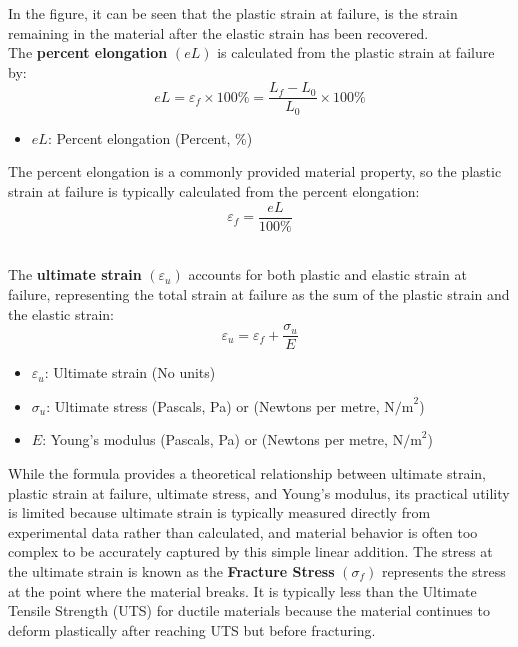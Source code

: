 \documentclass{article}
\begin{document}
\begin{minipage}{0.51\textwidth}
In the figure, it can be seen that the plastic strain at failure, is the strain remaining in the material after the elastic strain has been recovered.\\[8pt]
The \textbf{percent elongation} \((eL)\) is calculated from the plastic strain at failure by:
\begin{equation}
    eL = \varepsilon_f \times 100\% = \frac{L_f - L_0}{L_0} \times 100\%
    \label{el}
\end{equation}
\begin{itemize}[itemsep=-1mm]
    \item $eL$: Percent elongation (Percent, \%)
\end{itemize}
The percent elongation is a commonly provided material property, so the plastic strain at failure is typically calculated from the percent elongation:
\begin{equation}
    \varepsilon_f = \frac{eL}{100\%}
\end{equation}
\end{minipage}\\[8pt]
The \textbf{ultimate strain} $(\varepsilon_u)$ accounts for both plastic and elastic strain at failure, representing the total strain at failure as the sum of the plastic strain and the elastic strain:
\begin{equation}
    \varepsilon_u = \varepsilon_f + \frac{\sigma_{u}}{E}
\end{equation}
\begin{itemize}[itemsep=-1mm]
    \item $\varepsilon_u$: Ultimate strain (No units)
    \item $\sigma_{u}$: Ultimate stress (Pascals, Pa) or (Newtons per metre, \(\text{N/m}^2\))
    \item $E$: Young's modulus (Pascals, Pa) or (Newtons per metre, \(\text{N/m}^2\))
\end{itemize} 
While the formula provides a theoretical relationship between ultimate strain, plastic strain at failure, ultimate stress, and Young's modulus, its practical utility is limited because ultimate strain is typically measured directly from experimental data rather than calculated, and material behavior is often too complex to be accurately captured by this simple linear addition.
\newpage
The stress at the ultimate strain is known as the \textbf{Fracture Stress} \((\sigma_f)\) represents the stress at the point where the material breaks. It is typically less than the Ultimate Tensile Strength (UTS) for ductile materials because the material continues to deform plastically after reaching UTS but before fracturing.\\[8pt]
\end{document}

